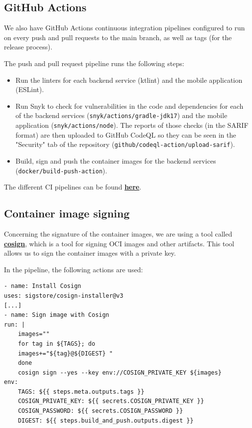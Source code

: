 \documentclass[12pt,x11names]{article}
\begin{document}
\subsection{GitHub Actions}

We also have GitHub Actions continuous integration pipelines configured to run on every
push and pull requests to the main branch, as well as tags (for the release process).

\medskip
The push and pull request pipeline runs the following steps:

\begin{itemize}
    \item Run the linters for each backend service (ktlint) and the mobile 
    application (ESLint).
    \item Run Snyk to check for vulnerabilities in the code and dependencies for each
    of the backend services (\texttt{snyk/actions/gradle-jdk17}) and the mobile application 
    (\texttt{snyk/actions/node}). The reports of those checks (in the SARIF format) are 
    then uploaded to GitHub CodeQL so they can be seen in the "Security" tab of the repository
    (\texttt{github/codeql-action/upload-sarif}).
    \item Build, sign and push the container images for the backend services (\texttt{docker/build-push-action}).
\end{itemize}

The different CI pipelines can be found \href{https://github.com/thomas-mauran/LinkedOut/tree/main/.github/workflows}{\textbf{here}}.

\subsection{Container image signing}

Concerning the signature of the container images, we are using a tool called 
\href{https://github.com/sigstore/cosign}{\textbf{cosign}}, which is a tool for signing
OCI images and other artifacts. This tool allows us to sign the container images with 
a private key.

\medskip
In the pipeline, the following actions are used:

\begin{lstlisting}
- name: Install Cosign
uses: sigstore/cosign-installer@v3
[...]
- name: Sign image with Cosign
run: |
    images=""
    for tag in ${TAGS}; do
    images+="${tag}@${DIGEST} "
    done
    cosign sign --yes --key env://COSIGN_PRIVATE_KEY ${images}
env:
    TAGS: ${{ steps.meta.outputs.tags }}
    COSIGN_PRIVATE_KEY: ${{ secrets.COSIGN_PRIVATE_KEY }}
    COSIGN_PASSWORD: ${{ secrets.COSIGN_PASSWORD }}
    DIGEST: ${{ steps.build_and_push.outputs.digest }}
\end{lstlisting}
\end{document}
